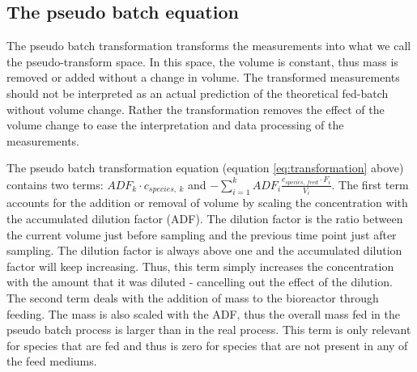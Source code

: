 \documentclass{bioinfo}
\begin{document}
\subsection{The pseudo batch equation}
The pseudo batch transformation transforms the measurements into what we call the pseudo-transform space. In this space, the volume is constant, thus mass is removed or added without a change in volume. The transformed measurements should not be interpreted as an actual prediction of the theoretical fed-batch without volume change. Rather the transformation removes the effect of the volume change to ease the interpretation and data processing of the measurements. 

The pseudo batch transformation equation (equation \ref{eq:transformation} above) contains two terms: $ADF_k \cdot c_{species, \: k}$ and $- \sum_{i=1}^{k}ADF_i\frac{c_{species, \: feed} \cdot F_{i}}{V_i}$. The first term accounts for the addition or removal of volume by scaling the concentration with the accumulated dilution factor (ADF). The dilution factor is the ratio between the current volume just before sampling and the previous time point just after sampling. The dilution factor is always above one and the accumulated dilution factor will keep increasing. Thus, this term simply increases the concentration with the amount that it was diluted - cancelling out the effect of the dilution. The second term deals with the addition of mass to the bioreactor through feeding. The mass is also scaled with the ADF, thus the overall mass fed in the pseudo batch process is larger than in the real process. This term is only relevant for species that are fed and thus is zero for species that are not present in any of the feed mediums.


\end{document}
